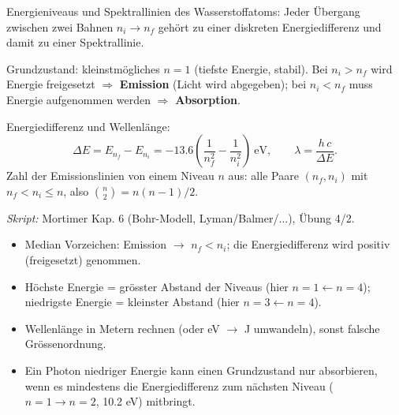 

Energieniveaus und Spektrallinien des Wasserstoffatoms: Jeder Übergang
zwischen zwei Bahnen $n_i \rightarrow n_f$ gehört zu einer diskreten
Energiedifferenz und damit zu einer Spektrallinie.

\begin{werkzeugkasten}
Grundzustand: kleinstmögliches $n = 1$ (tiefste Energie, stabil).
Bei $n_i > n_f$ wird Energie freigesetzt $\Rightarrow$ \textbf{Emission}
(Licht wird abgegeben); bei $n_i < n_f$ muss Energie aufgenommen werden
$\Rightarrow$ \textbf{Absorption}.

Energiedifferenz und Wellenlänge:
\begin{equation}
  \Delta E = E_{n_f} - E_{n_i}
  = -13.6\left(\frac{1}{n_f^2} - \frac{1}{n_i^2}\right)\ \mathrm{eV},
  \qquad \lambda = \frac{h\,c}{\Delta E}.
\end{equation}
Zahl der Emissionslinien von einem Niveau $n$ aus: alle Paare
$(n_f, n_i)$ mit $n_f < n_i \le n$, also $\binom{n}{2} = n(n-1)/2$.

\textit{Skript:} Mortimer Kap. 6 (Bohr-Modell, Lyman/Balmer/...), Übung 4/2.
\end{werkzeugkasten}

\begin{achtung}
\begin{itemize}
  \item Median Vorzeichen: Emission $\to$ $n_f < n_i$; die Energiedifferenz
        wird positiv (freigesetzt) genommen.
  \item Höchste Energie = grösster Abstand der Niveaus (hier $n=1 \leftarrow
        n=4$); niedrigste Energie = kleinster Abstand (hier $n=3 \leftarrow
        n=4$).
  \item Wellenlänge in Metern rechnen (oder eV $\to$ J umwandeln), sonst
        falsche Grössenordnung.
  \item Ein Photon niedriger Energie kann einen Grundzustand nur absorbieren,
        wenn es mindestens die Energiedifferenz zum nächsten Niveau
        ($n=1\to n=2$, 10.2 eV) mitbringt.
\end{itemize}
\end{achtung}
